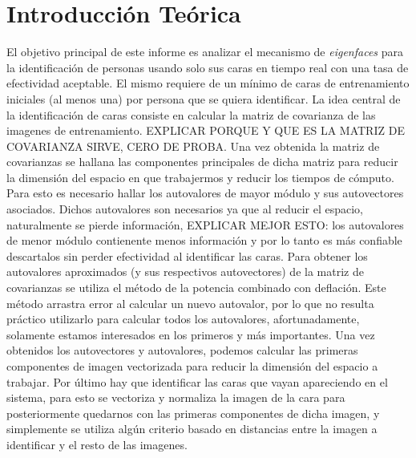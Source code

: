 \section{Introducción Teórica}
%
El objetivo principal de este informe es analizar el mecanismo de \emph{eigenfaces} para la identificación de personas usando solo sus caras en tiempo real con una tasa de efectividad aceptable. El mismo requiere de un mínimo de caras de entrenamiento iniciales (al menos una) por persona que se quiera identificar.
La idea central de la identificación de caras consiste en calcular la matriz de covarianza de las imagenes de entrenamiento. EXPLICAR PORQUE Y QUE ES LA MATRIZ DE COVARIANZA SIRVE, CERO DE PROBA. Una vez obtenida la matriz de covarianzas se hallana las componentes principales de dicha matriz para reducir la dimensión del espacio en que trabajermos y reducir los tiempos de cómputo. Para esto es necesario hallar los autovalores de mayor módulo y sus autovectores asociados. Dichos autovalores son necesarios ya que al reducir el espacio, naturalmente se pierde información, EXPLICAR MEJOR ESTO: los autovalores de menor módulo contienente menos información y por lo tanto es más confiable descartalos sin perder efectividad al identificar las caras. Para obtener los autovalores aproximados (y sus respectivos autovectores) de la matriz de covarianzas se utiliza el método de la potencia combinado con deflación. Este método arrastra error al calcular un nuevo autovalor, por lo que no resulta práctico utilizarlo para calcular todos los autovalores, afortunadamente, solamente estamos interesados en los primeros y más importantes.
Una vez obtenidos los autovectores y autovalores, podemos calcular las primeras componentes de imagen vectorizada para reducir la dimensión del espacio a trabajar.
Por último hay que identificar las caras que vayan apareciendo en el sistema, para esto se vectoriza y normaliza la imagen de la cara para posteriormente quedarnos con las primeras componentes de dicha imagen, y simplemente se utiliza algún criterio basado en  distancias entre la imagen a identificar y el resto de las imagenes.

